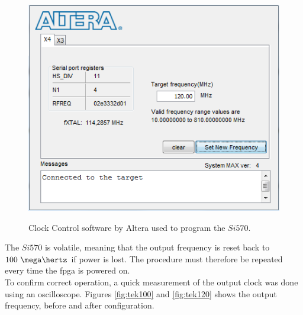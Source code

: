 \documentclass[main.tex]{subfiles}
\begin{document}
\begin{figure}[H] %
\begin{center}
\includegraphics[scale=0.8]{../img/clk_cont120}  \\[0.1 cm]
\caption{Clock Control software by Altera used to program the $Si570$.}
\label{fig:clk_cont120}
\end{center}
\end{figure} 

The $Si570$ is volatile, meaning that the output frequency is reset back to $100~\mega\hertz$ if power is lost. The procedure must therefore be repeated every time the \gls{fpga} is powered on.\\
To confirm correct operation, a quick measurement of the output clock was done using an oscilloscope. Figures \ref{fig:tek100} and \ref{fig:tek120} shows the output frequency, before and after configuration.\\
\end{document}
